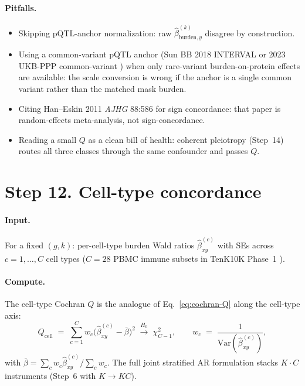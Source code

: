 \documentclass[11pt]{article}
\begin{document}
\paragraph{Pitfalls.}
\begin{itemize}
\item Skipping pQTL-anchor normalization: raw $\hat\beta^{(k)}_{\mathrm{burden},y}$ disagree by construction.
\item Using a common-variant pQTL anchor (Sun BB 2018 INTERVAL or 2023 UKB-PPP common-variant \citep{SunINTERVAL2018,SunUKBPPP2023}) when only rare-variant burden-on-protein effects are available: the scale conversion is wrong if the anchor is a single common variant rather than the matched mask burden.
\item Citing Han--Eskin 2011 \emph{AJHG} 88:586 for sign concordance: that paper is random-effects meta-analysis, not sign-concordance.
\item Reading a small $Q$ as a clean bill of health: coherent pleiotropy (Step~14) routes all three classes through the same confounder and passes $Q$.
\end{itemize}

\section*{Step 12. Cell-type concordance}

\paragraph{Input.} For a fixed $(g,k)$: per-cell-type burden Wald ratios $\hat\beta^{(c)}_{xy}$ with SEs across $c=1,\dots,C$ cell types ($C=28$ PBMC immune subsets in TenK10K Phase~1 \citep{Cuomo2025}).

\paragraph{Compute.} The cell-type Cochran $Q$ is the analogue of Eq.~\eqref{eq:cochran-Q} along the cell-type axis:
\begin{equation}
Q_{\mathrm{cell}} \;=\; \sum_{c=1}^{C} w_c\bigl(\hat\beta^{(c)}_{xy} - \bar\beta\bigr)^2 \;\xrightarrow{H_0}\; \chi^2_{C-1},\qquad w_c \;=\; \frac{1}{\mathrm{Var}(\hat\beta^{(c)}_{xy})},
\label{eq:Qcell}
\end{equation}
with $\bar\beta = \sum_c w_c \hat\beta^{(c)}_{xy} / \sum_c w_c$. The full joint stratified AR formulation stacks $K\cdot C$ instruments (Step~6 with $K\to KC$).
\end{document}
